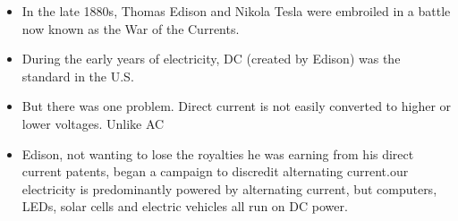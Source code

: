 \documentclass[preview]{standalone}
\begin{document}
\centering \begin{itemize}\item In the late 1880s, Thomas Edison and Nikola Tesla were embroiled in a battle now known as the War of the Currents.\item During the early years of electricity, DC (created by Edison) was the standard in the U.S.\item But there was one problem. Direct current is not easily converted to higher or lower voltages. Unlike AC\item Edison, not wanting to lose the royalties he was earning from his direct current patents, began a campaign to discredit alternating current.\itemToday our electricity is predominantly powered by alternating current, but computers, LEDs, solar cells and electric vehicles all run on DC power. \end{itemize}
\end{document}
